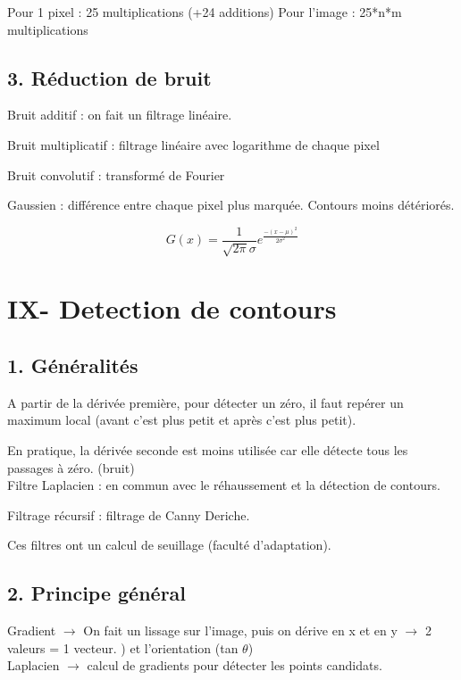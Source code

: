 \documentclass{report}
\begin{document}
Pour 1 pixel : 25 multiplications (+24 additions)
Pour l'image : 25*n*m multiplications

	\subsection*{3. Réduction de bruit}

Bruit additif : on fait un filtrage linéaire.

Bruit multiplicatif : filtrage linéaire avec logarithme de chaque pixel

Bruit convolutif : transformé de Fourier

Gaussien : différence entre chaque pixel plus marquée. Contours moins détériorés.

\[G(x)= \frac{1}{\sqrt{2 \pi}\sigma}e^{\frac{-(x-\mu)^{2}}{2\sigma^{2}}}\]

	\section*{IX- Detection de contours}
	\subsection*{1. Généralités}
	
A partir de la dérivée première, pour détecter un zéro, il faut repérer un maximum local (avant c'est plus petit et après c'est plus petit).
	
En pratique, la dérivée seconde est moins utilisée car elle détecte tous les passages à zéro. (bruit)\\

Filtre Laplacien : en commun avec le réhaussement et la détection de contours.

Filtrage récursif : filtrage de Canny Deriche. 

Ces filtres ont un calcul de seuillage (faculté d'adaptation).



	\subsection*{2. Principe général}

Gradient $\rightarrow$ On fait un lissage sur l'image, puis on dérive en x et en y $\rightarrow$ 2 valeurs = 1 vecteur.
) et l'orientation (tan $\theta$)\\

Laplacien $\rightarrow$ calcul de gradients pour détecter les points candidats.
\end{document}
